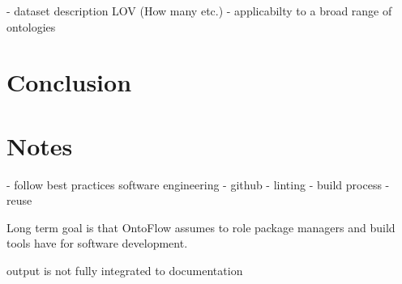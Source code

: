 \documentclass[sigconf]{acmart}
\begin{document}
- dataset description LOV (How many etc.)
- applicabilty to a broad range of ontologies 



\section{Conclusion}
\section{Notes}
- follow best practices software engineering
  - github
  - linting
  - build process
  - reuse

Long term goal is that OntoFlow assumes to role package managers and build tools have for software development.

output is not fully integrated to documentation


\end{document}
